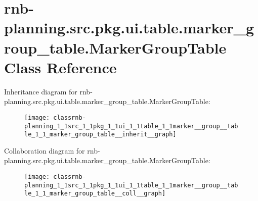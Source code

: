\hypertarget{classrnb-planning_1_1src_1_1pkg_1_1ui_1_1table_1_1marker__group__table_1_1_marker_group_table}{}\section{rnb-\/planning.src.\+pkg.\+ui.\+table.\+marker\+\_\+group\+\_\+table.\+Marker\+Group\+Table Class Reference}
\label{classrnb-planning_1_1src_1_1pkg_1_1ui_1_1table_1_1marker__group__table_1_1_marker_group_table}


Inheritance diagram for rnb-\/planning.src.\+pkg.\+ui.\+table.\+marker\+\_\+group\+\_\+table.\+Marker\+Group\+Table\+:
\nopagebreak
\begin{figure}[H]
\begin{center}
\leavevmode
\texttt{[image: classrnb-planning\_1\_1src\_1\_1pkg\_1\_1ui\_1\_1table\_1\_1marker\_\_group\_\_table\_1\_1\_marker\_group\_table\_\_inherit\_\_graph]}
\end{center}
\end{figure}


Collaboration diagram for rnb-\/planning.src.\+pkg.\+ui.\+table.\+marker\+\_\+group\+\_\+table.\+Marker\+Group\+Table\+:
\nopagebreak
\begin{figure}[H]
\begin{center}
\leavevmode
\texttt{[image: classrnb-planning\_1\_1src\_1\_1pkg\_1\_1ui\_1\_1table\_1\_1marker\_\_group\_\_table\_1\_1\_marker\_group\_table\_\_coll\_\_graph]}
\end{center}
\end{figure}
